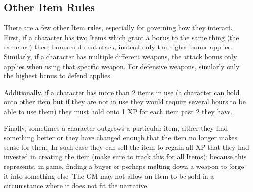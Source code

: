 \subsection{Other Item Rules}
There are a few other Item rules, especially for governing how they interact.
First, if a character has two Items which grant a bonus to the same thing (the same \Attribute{} or \Specialization) these bonuses do not stack, instead only the higher bonus applies.
Similarly, if a character has multiple different weapons, the attack bonus only applies when using that specific weapon.
For defensive weapons, similarly only the highest bonus to defend applies.

Additionally, if a character has more than 2 items in use (a character can hold onto other item but if they are not in use they would require several hours to be able to use them) they must hold onto 1 XP for each item past 2 they have.

Finally, sometimes a character outgrows a particular item, either they find something better or they have changed enough that the item no longer makes sense for them.
In such case they can sell the item to regain all XP that they had invested in creating the item (make sure to track this for all Items); because this represents, in game, finding a buyer or perhaps melting down a weapon to forge it into something else.
The GM may not allow an Item to be sold in a circumstance where it does not fit the narrative.
